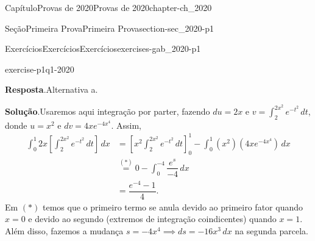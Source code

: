\documentclass[oneside,10pt,]{book}
\newcommand{\blocktitlefont}{\relax}
\numberwithin{equation}{section}
\newcommand{\R}{\mathbb R}
\begin{document}
\begin{chapterptx}{Capítulo}{Provas de 2020}{}{Provas de 2020}{}{}{chapter-ch_2020}
\begin{sectionptx}{Seção}{Primeira Prova}{}{Primeira Prova}{}{}{section-sec_2020-p1}
\begin{exercises-subsection-numberless}{Exercícios}{Exercícios}{}{Exercícios}{}{}{exercises-gab_2020-p1}
\begin{divisionexercise}{1}{}{}{exercise-p1q1-2020}
%
\par\smallskip%
\noindent\textbf{\blocktitlefont Resposta}.\hypertarget{answer-p1q1-2020-b}{}\quad{}Alternativa a.%
\par\smallskip%
\noindent\textbf{\blocktitlefont Solução}.\hypertarget{solution-p1q1-2020-c}{}\quad{}Usaremos aqui integração por parter, fazendo \(du=2x\) e \(v=\int_2^{2x^2} e^{-t^2}\,dt\), donde \(u=x^2\) e \(dv=4xe^{-4x^4}\). Assim,%
\begin{align*}
\int_0^1 2x\left[\int_2^{2x^2}
e^{-t^2}\,dt\right]\, dx&=\left[x^2 \int_2^{2x^2}
e^{-t^2}\,dt\right]_0^1-\int_0^1 (x^2)(4xe^{-4x^4})\, dx\\
&\stackrel{(\ast)}{=} 0-\int_0^{-4}
\dfrac{e^{s}}{-4}\, dx\\
&=\dfrac{e^{-4}-1}{4}.
\end{align*}
Em \((\ast)\) temos que o primeiro termo se anula devido ao primeiro fator quando \(x=0\) e devido ao segundo (extremos de integração coindicentes) quando \(x=1\). Além disso, fazemos a mudança \(s=-4x^4\implies ds=-16x^3\, dx\) na segunda parcela.%
\end{divisionexercise}%
\end{exercises-subsection-numberless}
\end{sectionptx}
\end{chapterptx}
\end{document}
